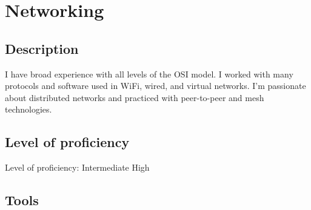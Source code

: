 \section{Networking}

\subsection{Description}

I have broad experience with all levels of the OSI model.
I worked with many protocols and software used in WiFi, wired, and virtual networks.
I'm passionate about distributed networks and practiced with peer-to-peer and mesh technologies.

\subsection{Level of proficiency}

Level of proficiency: Intermediate High

\subsection{Tools}

